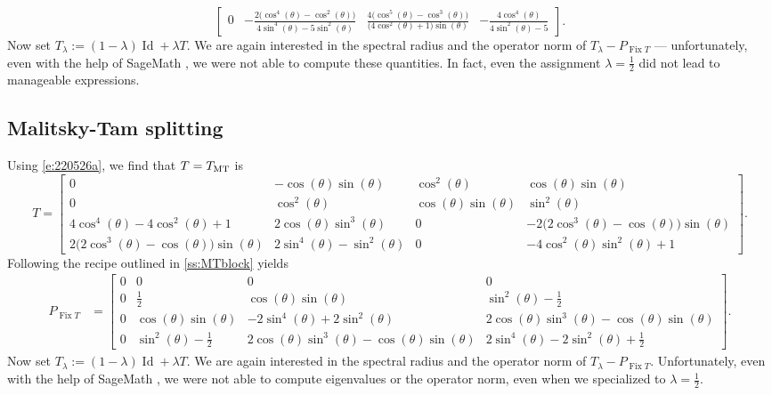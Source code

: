 \documentclass[11pt]{article}
\newcommand{\thalb}{\ensuremath{\tfrac{1}{2}}}
\newcommand{\Fix}{\ensuremath{\operatorname{Fix}}}
\newcommand{\Id}{\ensuremath{\operatorname{Id}}}
\newcommand{\tmt}{\ensuremath{T_{\text{\scriptsize MT}}}}
\theoremstyle{definition}
\providecommand{\Id}{\operatorname{{ Id}}}
\providecommand{\Id}{\operatorname{Id}}
\begin{document}
{{\begin{equation*}
\begin{bmatrix}
0 & -\frac{2 \big(\cos^4(\theta) - \cos^2(\theta)\big)}{4  \sin^4(\theta) - 5  \sin^2(\theta)} 
& \frac{4 \big(\cos^5(\theta) - \cos^3(\theta)\big)}{\big(4  \cos^2(\theta) + 1\big) \sin(\theta)} 
& -\frac{4 \cos^4(\theta)}{4 \sin^2(\theta) - 5} \end{bmatrix}.
\end{equation*}
Now set $T_\lambda := (1-\lambda)\Id+\lambda T$. 
We are again interested in the spectral radius and the operator norm of $T_\lambda-P_{\Fix T}$ --- unfortunately, even with the help of SageMath \cite{Sage}, we were not able to compute these quantities. 
In fact, even the assignment $\lambda=\thalb$ did not lead to
manageable expressions.

\subsection{Malitsky-Tam splitting}

Using \cref{e:220526a}, we find that 
$T=\tmt$ is 
\begin{equation*}
T = \begin{bmatrix}
0 & -\cos(\theta) \sin(\theta) & \cos^2(\theta) 
& \cos(\theta) \sin(\theta) \\
0 & \cos^2(\theta) & \cos(\theta) \sin(\theta) 
& \sin^2(\theta) \\
4 \cos^4(\theta) - 4 \cos^2(\theta) + 1 
& 2 \cos(\theta) \sin^3(\theta) & 0 
& -2 \big(2 \cos^3(\theta) - \cos(\theta)\big) \sin(\theta) \\
2 \big(2 \cos^3(\theta) - \cos(\theta)\big) \sin(\theta) 
& 2 \sin^4(\theta) - \sin^2(\theta) & 0 
& -4  \cos^2(\theta) \sin^2(\theta) + 1
\end{bmatrix}. 
\end{equation*}
Following the recipe outlined in \cref{ss:MTblock} yields
\begin{align*}
P_{\Fix T} &= 
\begin{bmatrix} 
0 & 0 & 0 & 0 \\ 0 
& \thalb & \cos(\theta)\sin(\theta) 
& \sin^2(\theta) - \thalb \\ 
0 & \cos(\theta) \sin(\theta) 
& -2 \sin^4(\theta) + 2 \sin^2(\theta) 
& 2 \cos(\theta)\sin^3(\theta) - \cos(\theta)\sin(\theta) \\ 
0 & \sin^2(\theta) - \thalb 
& 2 \cos(\theta)\sin^3(\theta) - \cos(\theta)\sin(\theta)
& 2 \sin^4(\theta) - 2 \sin^2(\theta) + \thalb
\end{bmatrix}. 
\end{align*}
Now set $T_\lambda := (1-\lambda)\Id+\lambda T$. 
We are again interested in the spectral radius and the operator norm of $T_\lambda-P_{\Fix T}$. 
Unfortunately, even with the help of SageMath \cite{Sage}, we were not able to compute eigenvalues or the operator norm, even when we specialized to $\lambda=\thalb$. 



}}
\end{document}
